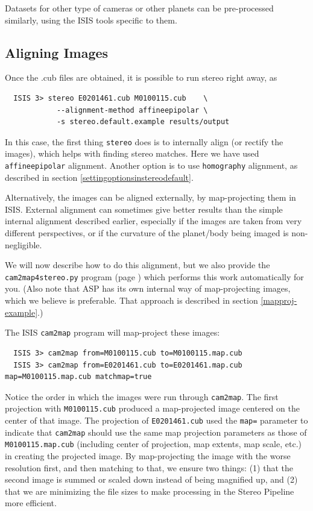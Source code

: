 Datasets for other type of cameras or other planets can be pre-processed
similarly, using the ISIS tools specific to them.

\subsection{Aligning Images}
\label{sec:AligningImages}

Once the .cub files are obtained, it is possible to run stereo right away,
as
\begin{verbatim}
  ISIS 3> stereo E0201461.cub M0100115.cub    \
            --alignment-method affineepipolar \
            -s stereo.default.example results/output
\end{verbatim}

In this case, the first thing \texttt{stereo} does is to internally
align (or rectify the images), which helps with finding stereo matches.
Here we have used \texttt{affineepipolar} alignment.  Another option is
to use \texttt{homography} alignment, as described in section
\ref{settingoptionsinstereodefault}.

Alternatively, the images can be aligned externally, by map-projecting
them in \ac{ISIS}. External alignment can sometimes give better results
than the simple internal alignment described earlier, especially if the
images are taken from very different perspectives, or if the curvature
of the planet/body being imaged is non-negligible.


We will now describe how to do this alignment, but we also provide the
\texttt{cam2map4stereo.py} program (page \pageref{cam2map4stereo}) which
performs this work automatically for you. (Also note that ASP has its
own internal way of map-projecting images, which we believe is preferable.
That approach is described in section \ref{mapproj-example}.)

The \ac{ISIS} \texttt{cam2map} program will map-project these images:

\begin{verbatim}
  ISIS 3> cam2map from=M0100115.cub to=M0100115.map.cub
  ISIS 3> cam2map from=E0201461.cub to=E0201461.map.cub map=M0100115.map.cub matchmap=true
\end{verbatim}

Notice the order in which the images were run through
\texttt{cam2map}. The first projection with \texttt{M0100115.cub}
produced a map-projected image centered on the center of that image.
The projection of \texttt{E0201461.cub} used the \texttt{map=}
parameter to indicate that \texttt{cam2map} should use the same map
projection parameters as those of \texttt{M0100115.map.cub} (including
center of projection, map extents, map scale, etc.) in creating the
projected image. By map-projecting the image with the worse resolution
first, and then matching to that, we ensure two things: (1) that the
second image is summed or scaled down instead of being magnified up,
and (2) that we are minimizing the file sizes to make processing in
the Stereo Pipeline more efficient.

